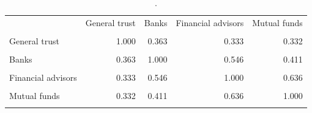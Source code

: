 \begin{table}[htbp]\centering\small
\caption{.}
\label{tab:fin_trust_components_corr}
\begin{tabular}{lrrrr}\toprule
 & General trust & Banks & Financial advisors & Mutual funds \\\\ \midrule
General trust & 1.000 & 0.363 & 0.333 & 0.332 \\\\
Banks & 0.363 & 1.000 & 0.546 & 0.411 \\\\
Financial advisors & 0.333 & 0.546 & 1.000 & 0.636 \\\\
Mutual funds & 0.332 & 0.411 & 0.636 & 1.000 \\\\
\bottomrule
\end{tabular}\end{table}
